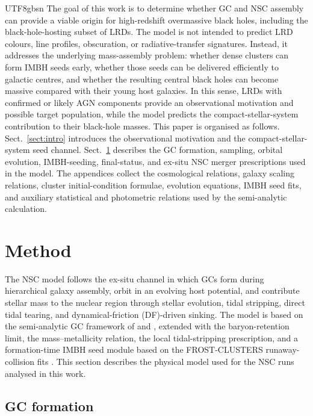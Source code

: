 \documentclass[trackchanges, twocolappendix, twocolumn]{aastex701}
\begin{document}
\begin{CJK*}{UTF8}{gbsn}
The goal of this work is to determine whether GC and NSC assembly can provide a viable origin for high-redshift overmassive black holes, including the black-hole-hosting subset of LRDs. The model is not intended to predict LRD colours, line profiles, obscuration, or radiative-transfer signatures. Instead, it addresses the underlying mass-assembly problem: whether dense clusters can form IMBH seeds early, whether those seeds can be delivered efficiently to galactic centres, and whether the resulting central black holes can become massive compared with their young host galaxies. In this sense, LRDs with confirmed or likely AGN components provide an observational motivation and possible target population, while the model predicts the compact-stellar-system contribution to their black-hole masses. This paper is organised as follows. Sect.~\ref{sect:intro} introduces the observational motivation and the compact-stellar-system seed channel. Sect.~\ref{sect:method} describes the GC formation, sampling, orbital evolution, IMBH-seeding, final-status, and ex-situ NSC merger prescriptions used in the model. The appendices collect the cosmological relations, galaxy scaling relations, cluster initial-condition formulae, evolution equations, IMBH seed fits, and auxiliary statistical and photometric relations used by the semi-analytic calculation.

\section{Method} \label{sect:method}

The NSC model follows the ex-situ channel in which GCs form during hierarchical galaxy assembly, orbit in an evolving host potential, and contribute stellar mass to the nuclear region through stellar evolution, tidal stripping, direct tidal tearing, and dynamical-friction (DF)-driven sinking. The model is based on the semi-analytic GC framework of \cite{Choksi+2018GC} and \cite{Gao+2024GC}, extended with the \cite{Chen&Gnedin2023GC} baryon-retention limit, the \cite{Chen&Gnedin2024aGC} mass--metallicity relation, the \cite{Fragione+2019GC} local tidal-stripping prescription, and a formation-time IMBH seed module based on the FROST-CLUSTERS runaway-collision fits \citep{Rantala+2026FROST}. This section describes the physical model used for the NSC runs analysed in this work.

\subsection{GC formation} \label{subsect:GCformation}


\end{CJK*}
\end{document}
